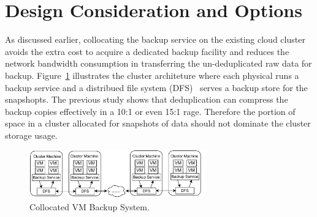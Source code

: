 \section{Design Consideration and Options}
\label{sect:options}

As discussed earlier, collocating the backup service on the existing
cloud cluster avoids the extra cost to acquire a dedicated backup facility
and reduces the network bandwidth consumption in transferring the un-deduplicated
raw data for backup. 
Figure~\ref{fig:collocated} illustrates the cluster architeture where
each physical runs a backup service and a distribued file system (DFS)~\cite{GFS2004,Hadoop} 
serves a backup store  for the snapshopts.
The previous study shows that 
 deduplication can compress the backup copies 
effectively in a 10:1 or even 15:1 rage. 
Therefore  the portion of space in a cluster
allocated for snapshots of data should not dominate
the cluster storage usage.





\begin{figure}[htb]
    \centering
    \includegraphics[width=3in]{images/colocated-arch.pdf}
    \caption{Collocated VM Backup System.}
    \label{fig:collocated}
\end{figure}



